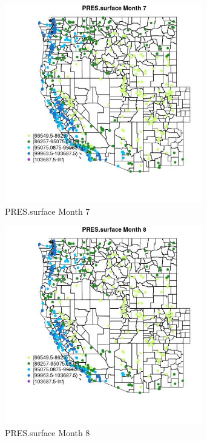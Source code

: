 \begin{figure} 
\centering  
\includegraphics[width=0.77\textwidth]{Code_Outputs/Report_ML_input_PM25_Step4_part_e_de_duplicated_aves_compiled_2019-05-14wNAs_MapObsMo7PRESsurface.jpg} 
\caption{\label{fig:Report_ML_input_PM25_Step4_part_e_de_duplicated_aves_compiled_2019-05-14wNAsMapObsMo7PRESsurface}PRES.surface Month 7} 
\end{figure} 
 

\clearpage 

\begin{figure} 
\centering  
\includegraphics[width=0.77\textwidth]{Code_Outputs/Report_ML_input_PM25_Step4_part_e_de_duplicated_aves_compiled_2019-05-14wNAs_MapObsMo8PRESsurface.jpg} 
\caption{\label{fig:Report_ML_input_PM25_Step4_part_e_de_duplicated_aves_compiled_2019-05-14wNAsMapObsMo8PRESsurface}PRES.surface Month 8} 
\end{figure} 
 

